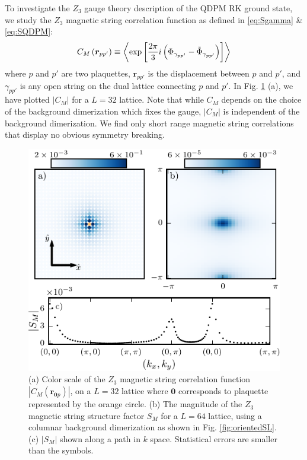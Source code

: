 \documentclass[twocolumn,prb,aps,floatfix,superscriptaddress]{revtex4-1}
\newcommand{\figref}[1]{Fig. \ref{#1}}
\begin{document}
To investigate the $Z_3$ gauge theory description of the QDPM RK ground state, we study the $Z_3$ magnetic string correlation function as defined in \eqref{eq:Sgamma} \& \eqref{eq:SQDPM}:
\begin{equation}
C_M \left( \bm{r}_{pp'} \right) \equiv \left \langle \exp \left[ \frac{2 \pi}{3} i \left( \Phi_{\gamma_{pp'}} -\tilde{\Phi}_{\gamma_{pp'}} \right) \right] \right \rangle  \notag
\end{equation}
where $p$ and $p'$ are two plaquettes, $\bm{r}_{pp'}$ is the displacement between $p$ and $p'$,  and $\gamma_{pp'}$ is any open string on the dual lattice
connecting $p$ and $p'$. In \figref{fig:vison_3way} (a), we have plotted $|C_M|$ for a $L=32$ lattice. Note that while $C_M$ depends on the choice of the background dimerization which fixes the gauge, $|C_M|$ is independent of the background dimerization. We find only short range magnetic string correlations that display no obvious symmetry breaking. 
    \begin{figure}
        \centering
        \includegraphics[width=1.0\columnwidth]{vison_3way.pdf}
        \caption
        {
            (a) Color scale of the $Z_3$ magnetic string correlation function $|C_M(\bm{r}_{\bm{0}p})|$,
            on a $L=32$ lattice where $\bm{0}$ corresponds to plaquette represented by the orange circle.
            (b) The magnitude of the $Z_3$ magnetic string structure factor $S_M$ for a $L=64$ lattice, using a columnar background dimerization as shown in \figref{fig:orientedSL}.             
            (c) $|S_M|$ shown along a path in $k$ space. Statistical errors are smaller than the symbols.
        }
        \label{fig:vison_3way}
    \end{figure}
\end{document}
